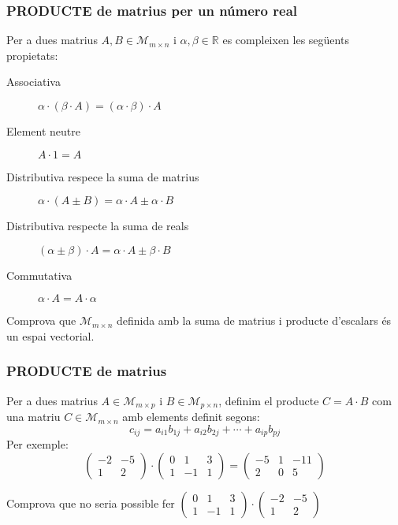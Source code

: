 \documentclass{beamer}
\begin{document}
\begin{frame}
\frametitle{PRODUCTE de matrius per un número real}
Per a dues matrius $A,B \in \mathscr{M}_{m\times n}$ i $\alpha,\beta \in \mathbb{R}$ es compleixen les següents propietats:
\begin{description}
  \item[Associativa] $\alpha \cdot (\beta \cdot A) = (\alpha \cdot \beta) \cdot A$
  \item[Element neutre] $A\cdot 1=A$
  \item[Distributiva respece la suma de matrius] $\alpha \cdot (A \pm B)=\alpha \cdot A \pm \alpha \cdot B$
  \item[Distributiva respecte la suma de reals] $(\alpha \pm \beta)\cdot A = \alpha \cdot A \pm \beta \cdot B$
  \item[Commutativa] $\alpha \cdot A = A \cdot \alpha$
\end{description}
\begin{exercici}{}
  Comprova que $\mathscr{M}_{m\times n}$ definida amb la suma de matrius i producte d'escalars és un espai vectorial.
\end{exercici}
\end{frame}

\begin{frame}
\frametitle{PRODUCTE de matrius}
Per a dues matrius $A \in \mathscr{M}_{m\times p}$ i $B \in \mathscr{M}_{p\times n}$, definim el producte $C=A\cdot B$ com una matriu $C \in \mathscr{M}_{m\times n}$ amb elements definit segons:
\[
c_{ij}=a_{i1}b_{1j}+a_{i2}b_{2j}+\cdots +a_{ip}b_{pj}
\]
Per exemple:
\[
\begin{pmatrix}
  -2 & -5\\
  1 & 2
\end{pmatrix}
\cdot
\begin{pmatrix}
  0 & 1 & 3\\
  1 & -1 & 1
\end{pmatrix}
=
\begin{pmatrix}
  -5 & 1 & -11\\
  2 & 0 & 5
\end{pmatrix}
\]

\begin{exercici}{}
  Comprova que no seria possible fer $
\begin{pmatrix}
  0 & 1 & 3\\
  1 & -1 & 1
\end{pmatrix}
\cdot
\begin{pmatrix}
  -2 & -5\\
  1 & 2
\end{pmatrix}$
\end{exercici}
\end{frame}
\end{document}
